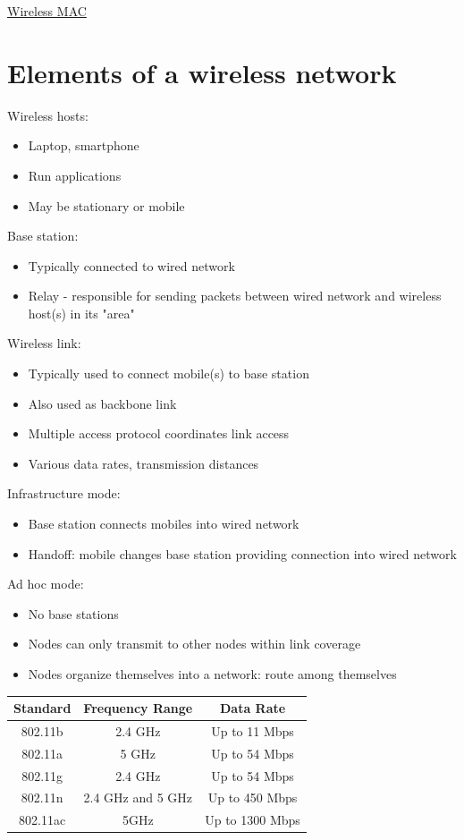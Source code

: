 \documentclass{article}[18pt]
\begin{document}
\begin{center}
\underline{\huge Wireless MAC}
\end{center}
\section{Elements of a wireless network}
Wireless hosts:
\begin{itemize}
	\item Laptop, smartphone
	\item Run applications
	\item May be stationary or mobile
\end{itemize}
Base station:
\begin{itemize}
	\item Typically connected to wired network
	\item Relay - responsible for sending packets between wired network and wireless host(s) in its "area" 
\end{itemize}
Wireless link:
\begin{itemize}
	\item Typically used to connect mobile(s) to base station
	\item Also used as backbone link
	\item Multiple access protocol coordinates link access
	\item Various data rates, transmission distances
\end{itemize}
Infrastructure mode:
\begin{itemize}
	\item Base station connects mobiles into wired network
	\item Handoff: mobile changes base station providing connection into wired network
\end{itemize}
Ad hoc mode:
\begin{itemize}
	\item No base stations
	\item Nodes can only transmit to other nodes within link coverage
	\item Nodes organize themselves into a network: route among themselves
\end{itemize}
\begin{tabular}{|c|c|c|}
	\hline 
	Standard & Frequency Range & Data Rate \\ 
	\hline 
	802.11b & 2.4 GHz & Up to 11 Mbps \\ 
	\hline 
	802.11a & 5 GHz & Up to 54 Mbps \\ 
	\hline 
	802.11g & 2.4 GHz & Up to 54 Mbps \\ 
	\hline 
	802.11n & 2.4 GHz and 5 GHz & Up to 450 Mbps \\ 
	\hline 
	802.11ac & 5GHz & Up to 1300 Mbps \\ 
	\hline 
\end{tabular} 
\end{document}
